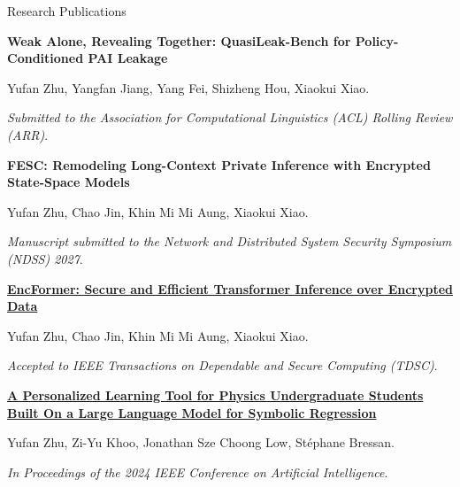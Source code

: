 \begin{rubric}{Research Publications}

\entry*[2026]
    \textbf{Weak Alone, Revealing Together: QuasiLeak-Bench for Policy-Conditioned PAI Leakage} \par
    Yufan Zhu, Yangfan Jiang, Yang Fei, Shizheng Hou, Xiaokui Xiao.\par
    \textit{Submitted to the Association for Computational Linguistics (ACL) Rolling Review (ARR)}.

\entry*[2026]
    \textbf{FESC: Remodeling Long-Context Private Inference with Encrypted State-Space Models} \par
    Yufan Zhu, Chao Jin, Khin Mi Mi Aung, Xiaokui Xiao.\par
    \textit{Manuscript submitted to the Network and Distributed System Security Symposium (NDSS) 2027}.

\entry*[2026]
    \textbf{\href{https://arxiv.org/abs/2604.09975}{EncFormer: Secure and Efficient Transformer Inference over Encrypted Data}} \par
    Yufan Zhu, Chao Jin, Khin Mi Mi Aung, Xiaokui Xiao.\par
    \textit{Accepted to IEEE Transactions on Dependable and Secure Computing (TDSC)}.

\entry*[2024]
    \textbf{\href{https://ieeexplore.ieee.org/document/10605241}{A Personalized Learning Tool for Physics Undergraduate Students Built On a Large Language Model for Symbolic Regression}} \par
    Yufan Zhu, Zi-Yu Khoo, Jonathan Sze Choong Low, Stéphane Bressan.\par
    \textit{In Proceedings of the 2024 IEEE Conference on Artificial Intelligence}.

\end{rubric}

